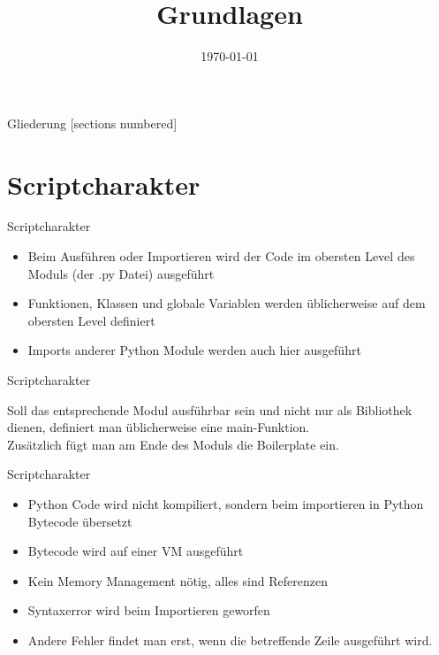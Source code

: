 



\title{Grundlagen}
\date{\today}




\maketitle

\begin{frame}{Gliederung}
	[sections numbered]
	\tableofcontents
\end{frame}



\section{Scriptcharakter}
\begin{frame}[fragile]{Scriptcharakter}
	\begin{itemize}
		\item Beim Ausführen oder Importieren wird der Code im obersten Level des Moduls (der .py Datei) ausgeführt
		\item Funktionen, Klassen und globale Variablen werden üblicherweise auf dem obersten Level definiert
		\item Imports anderer Python Module werden auch hier ausgeführt
	\end{itemize}
\end{frame}

\begin{frame}[fragile]{Scriptcharakter}
	 
	Soll das entsprechende Modul ausführbar sein und nicht nur als Bibliothek dienen, definiert man üblicherweise eine \alert{main}-Funktion.\\
	Zus\"atzlich f\"ugt man am Ende des Moduls die Boilerplate ein.\\
\end{frame}

\begin{frame}{Scriptcharakter}
	\begin{itemize}
		\item Python Code wird nicht kompiliert, sondern beim importieren in Python Bytecode übersetzt
		\item Bytecode wird auf einer VM ausgeführt
		\item Kein Memory Management nötig, alles sind Referenzen
		\item Syntaxerror wird beim Importieren geworfen
		\item Andere Fehler findet man erst, wenn die betreffende Zeile ausgeführt wird.
	\end{itemize}
\end{frame}



